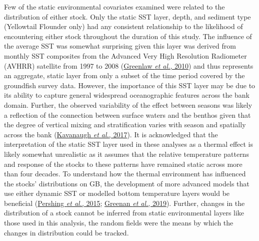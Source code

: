 \documentclass[
]{article}
\begin{document}
Few of the static environmental covariates examined were related to the distribution of either stock. Only the static SST layer, depth, and sediment type (Yellowtail Flounder only) had any consistent relationship to the likelihood of encountering either stock throughout the duration of this study. The influence of the average SST was somewhat surprising given this layer was derived from monthly SST composites from the Advanced Very High Resolution Radiometer (AVHRR) satellite from 1997 to 2008 (\protect\hyperlink{ref-greenlawGeodatabaseHistoricalContemporary2010}{Greenlaw \emph{et al.}, 2010}) and thus represents an aggregate, static layer from only a subset of the time period covered by the groundfish survey data. However, the importance of this SST layer may be due to its ability to capture general widespread oceanographic features across the bank domain. Further, the observed variability of the effect between seasons was likely a reflection of the connection between surface waters and the benthos given that the degree of vertical mixing and stratification varies with season and spatially across the bank (\protect\hyperlink{ref-kavanaughThirtyThreeYearsOcean2017}{Kavanaugh \emph{et al.}, 2017}). It is acknowledged that the interpretation of the static SST layer used in these analyses as a thermal effect is likely somewhat unrealistic as it assumes that the relative temperature patterns and response of the stocks to these patterns have remained static across more than four decades. To understand how the thermal environment has influenced the stocks' distributions on GB, the development of more advanced models that use either dynamic SST or modelled bottom temperature layers would be beneficial (\protect\hyperlink{ref-pershingSlowAdaptationFace2015}{Pershing \emph{et al.}, 2015}; \protect\hyperlink{ref-greenanClimateChangeVulnerability2019}{Greenan \emph{et al.}, 2019}). Further, changes in the distribution of a stock cannot be inferred from static environmental layers like those used in this analysis, the random fields were the means by which the changes in distribution could be tracked.
\end{document}
